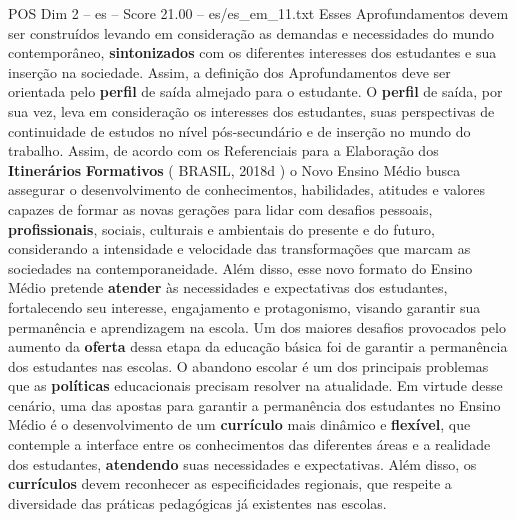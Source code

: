 \begin{textsample}{POS Dim 2 – es – Score 21.00 – es/es\_em\_11.txt}
Esses Aprofundamentos devem ser construídos levando em consideração as demandas e necessidades do mundo contemporâneo, \textbf{sintonizados} com os diferentes interesses dos estudantes e sua inserção na sociedade.
Assim, a definição dos Aprofundamentos deve ser orientada pelo \textbf{perfil} de saída almejado para o estudante.
O \textbf{perfil} de saída, por sua vez, leva em consideração os interesses dos estudantes, suas perspectivas de continuidade de estudos no nível pós-secundário e de inserção no mundo do trabalho.
Assim, de acordo com os Referenciais para a Elaboração dos \textbf{Itinerários} \textbf{Formativos} ( BRASIL, 2018d ) o Novo Ensino Médio busca assegurar o desenvolvimento de conhecimentos, habilidades, atitudes e valores capazes de formar as novas gerações para lidar com desafios pessoais, \textbf{profissionais}, sociais, culturais e ambientais do presente e do futuro, considerando a intensidade e velocidade das transformações que marcam as sociedades na contemporaneidade.
Além disso, esse novo formato do Ensino Médio pretende \textbf{atender} às necessidades e expectativas dos estudantes, fortalecendo seu interesse, engajamento e protagonismo, visando garantir sua permanência e aprendizagem na escola.
Um dos maiores desafios provocados pelo aumento da \textbf{oferta} dessa etapa da educação básica foi de garantir a permanência dos estudantes nas escolas.
O abandono escolar é um dos principais problemas que as \textbf{políticas} educacionais precisam resolver na atualidade.
Em virtude desse cenário, uma das apostas para garantir a permanência dos estudantes no Ensino Médio é o desenvolvimento de um \textbf{currículo} mais dinâmico e \textbf{flexível}, que contemple a interface entre os conhecimentos das diferentes áreas e a realidade dos estudantes, \textbf{atendendo} suas necessidades e expectativas.
Além disso, os \textbf{currículos} devem reconhecer as especificidades regionais, que respeite a diversidade das práticas pedagógicas já existentes nas escolas.

\end{textsample}

